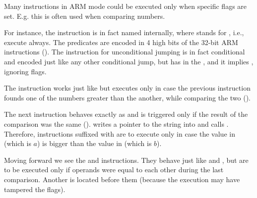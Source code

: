 \label{subsec:jcc_ARM}

\mysubparagraph{\OptimizingKeilVI (\ARMMode)}




Many instructions in ARM mode could be executed only when specific flags are set.
E.g. this is often used when comparing numbers.


For instance, the \ADD instruction is in fact named  internally, where  stands for
, i.e., execute always.
The predicates are encoded in 4 high bits of the 32-bit ARM instructions ().
The  instruction for unconditional jumping is in fact conditional and encoded just like any other
conditional jump, but has  in the , and it implies , 
ignoring flags.


The  instruction works just like  but executes only in case the previous \CMP
instruction founds one of the numbers greater than the another, while comparing the two ().


The next  instruction behaves exactly as  
and is triggered only if the result of the comparison was the same (). 
 writes a pointer to the string  into  and  calls \printf.
Therefore, instructions suffixed with  are to execute only in case the value in  (which is $a$) is bigger than the value in  (which is $b$).


Moving forward we see the  and  instructions.
They behave just like  and , but are to be executed only if operands were equal to each
other during the last comparison.
Another \CMP is located before them (because the \printf execution may have tampered the flags).

